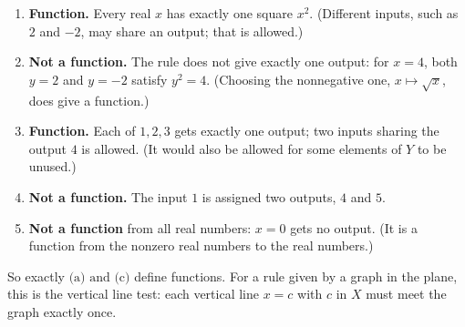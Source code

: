 \begin{enumerate}
\item[(a)] \textbf{Function.} Every real $x$ has exactly one square $x^2$. (Different inputs, such as $2$ and $-2$, may share an output; that is allowed.)
\item[(b)] \textbf{Not a function.} The rule does not give exactly one output: for $x=4$, both $y=2$ and $y=-2$ satisfy $y^2=4$. (Choosing the nonnegative one, $x\mapsto\sqrt x$, does give a function.)
\item[(c)] \textbf{Function.} Each of $1,2,3$ gets exactly one output; two inputs sharing the output $4$ is allowed. (It would also be allowed for some elements of $Y$ to be unused.)
\item[(d)] \textbf{Not a function.} The input $1$ is assigned two outputs, $4$ and $5$.
\item[(e)] \textbf{Not a function} from all real numbers: $x=0$ gets no output. (It is a function from the nonzero real numbers to the real numbers.)
\end{enumerate}
So exactly $\boxed{\text{(a) and (c)}}$ define functions. For a rule given by a graph in the plane, this is the vertical line test: each vertical line $x=c$ with $c$ in $X$ must meet the graph exactly once.
